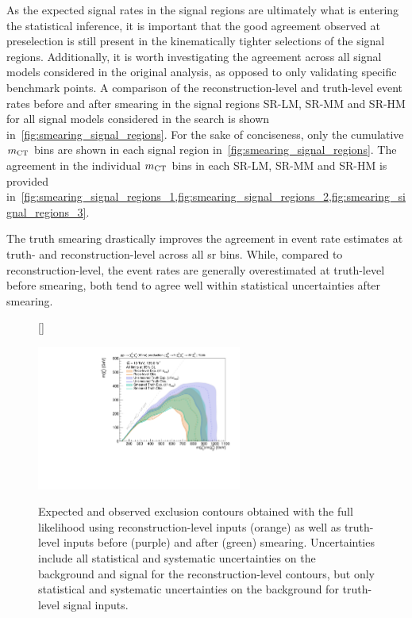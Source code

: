  As the expected signal rates in the signal regions are ultimately what is entering the statistical inference, it is important that the good agreement observed at preselection is still present in the kinematically tighter selections of the signal regions.
 Additionally, it is worth investigating the agreement across all signal models considered in the original analysis, as opposed to only validating specific benchmark points.
 A comparison of the reconstruction-level and truth-level event rates before and after smearing in the signal regions SR-LM, SR-MM and SR-HM for all signal models considered in the \onelepton search is shown in~\cref{fig:smearing_signal_regions}.
 For the sake of conciseness, only the cumulative $m_{\textrm{CT}}$ bins are shown in each signal region in~\cref{fig:smearing_signal_regions}.
 The agreement in the individual $m_{\textrm{CT}}$ bins in each SR-LM, SR-MM and SR-HM is provided in~\cref{fig:smearing_signal_regions_1,fig:smearing_signal_regions_2,fig:smearing_signal_regions_3}.
 
The truth smearing drastically improves the agreement in event rate estimates at truth- and reconstruction-level across all \gls{sr} bins.
While, compared to reconstruction-level, the event rates are generally overestimated at truth-level before smearing, both tend to agree well within statistical uncertainties after smearing. 
 
\begin{figure}
[\FBwidth]
{\caption{Expected and observed exclusion contours obtained with the full likelihood using reconstruction-level inputs (orange) as well as truth-level inputs before (purple) and after (green) smearing. Uncertainties include all statistical and systematic uncertainties on the background and signal for the reconstruction-level contours, but only statistical and systematic uncertainties on the background for truth-level signal inputs.}\label{fig:simplified_likelihood_after_smearing}}
{\includegraphics[width=0.60\textwidth]{exclusion_1Lbb_truthInput_compareReco_BkgOnly_noLabel}}
\end{figure}
 
